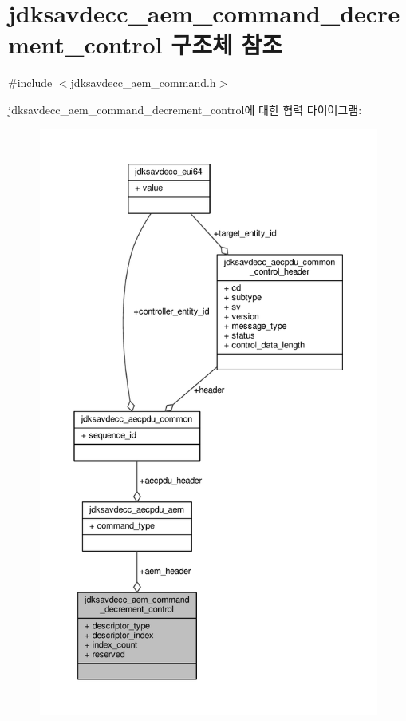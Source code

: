 \hypertarget{structjdksavdecc__aem__command__decrement__control}{}\section{jdksavdecc\+\_\+aem\+\_\+command\+\_\+decrement\+\_\+control 구조체 참조}
\label{structjdksavdecc__aem__command__decrement__control}


{\ttfamily \#include $<$jdksavdecc\+\_\+aem\+\_\+command.\+h$>$}



jdksavdecc\+\_\+aem\+\_\+command\+\_\+decrement\+\_\+control에 대한 협력 다이어그램\+:
\nopagebreak
\begin{figure}[H]
\begin{center}
\leavevmode
\includegraphics[height=550pt]{structjdksavdecc__aem__command__decrement__control__coll__graph}
\end{center}
\end{figure}
